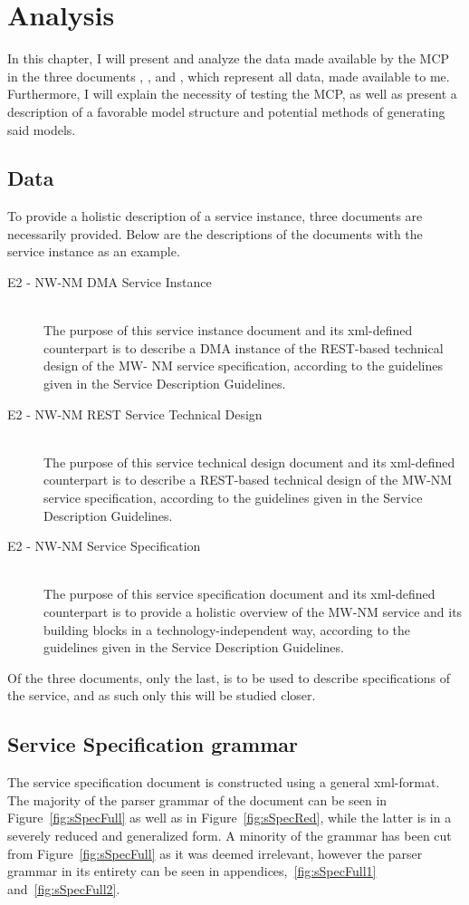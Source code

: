 \chapter{Analysis}

In this chapter, I will present and analyze the data made available by the MCP in the three documents , , and , which represent all data, made available to me. Furthermore, I will explain the necessity of testing the MCP, as well as present a description of a favorable model structure and potential methods of generating said models.

\section{Data}

To provide a holistic description of a service instance, three documents are necessarily provided. Below are the descriptions of the documents with the service instance  as an example.
\begin{description}
  \item[E2 - NW-NM DMA Service Instance]\ \\
    The purpose of this service instance document and its xml-defined counterpart is to describe a DMA instance of the REST-based technical design of the MW- NM service specification, according to the guidelines given in the Service Description Guidelines.
  \item[E2 - NW-NM REST Service Technical Design]\ \\
    The purpose of this service technical design document and its xml-defined counterpart is to describe a REST-based technical design of the MW-NM service specification, according to the guidelines given in the Service Description Guidelines.
  \item[E2 - NW-NM Service Specification]\ \\
    The purpose of this service specification document and its xml-defined counterpart is to provide a holistic overview of the MW-NM service and its building blocks in a technology-independent way, according to the guidelines given in the Service Description Guidelines.
\end{description}
Of the three documents, only the last,  is to be used to describe specifications of the service, and as such only this will be studied closer.
\section{Service Specification grammar}
The service specification document is constructed using a general xml-format. The majority of the parser grammar of the document can be seen in Figure~\ref{fig:sSpecFull} as well as in Figure~\ref{fig:sSpecRed}, while the latter is in a severely reduced and generalized form. A minority of the grammar has been cut from Figure~\ref{fig:sSpecFull} as it was deemed irrelevant, however the parser grammar in its entirety can be seen in appendices,~\ref{fig:sSpecFull1} and~\ref{fig:sSpecFull2}.

